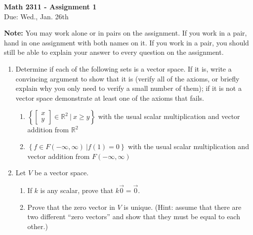 \documentclass[12pt]{article}
\newcommand{\DS} [1] {${\displaystyle #1}$}
\begin{document}
\thispagestyle{empty}

\begin{center}
        \textbf{Math 2311  - Assignment 1}\\
        Due: Wed., Jan. 26th
\end{center}

{\bf Note:} You may work alone or in pairs on the assignment. If you work in a pair, hand in one assignment with both names on it. If you work in a pair, you should still be able to explain your answer to every question on the assignment.


\begin{enumerate}


        \item
              Determine if each of the following sets is a vector space.  If it is, write a convincing argument to show that it is (verify all of the axioms, or briefly explain why you only need to verify a small number of them); if it is not a vector space demonstrate at least one of the axioms that fails.
              \begin{enumerate}
                      \item \DS{ \left\{ \left[ \begin{array}{c}
                                                    x \\
                                                    y
                                            \end{array} \right] \in \mathbb{R}^2 \ | \ x \geq y \right\}} with the usual scalar multiplication and vector addition from $\mathbb{R}^2$
                      \item \DS{ \left\{f\in F (-\infty, \infty)\ | {f (1) = 0} \right\}} with the usual scalar multiplication and vector addition from $F(-\infty, \infty)$
              \end{enumerate}

        \item
              Let $V$ be a vector space.
              \begin{enumerate}
                      \item If $k$ is any scalar, prove that $k\vec{0} = \vec{0}$.
                      \item Prove that the zero vector in $V$ is unique. (Hint: assume that there are two different ``zero vectors'' and show that they must be equal to each other.)
              \end{enumerate}



\end{enumerate}
\end{document}

